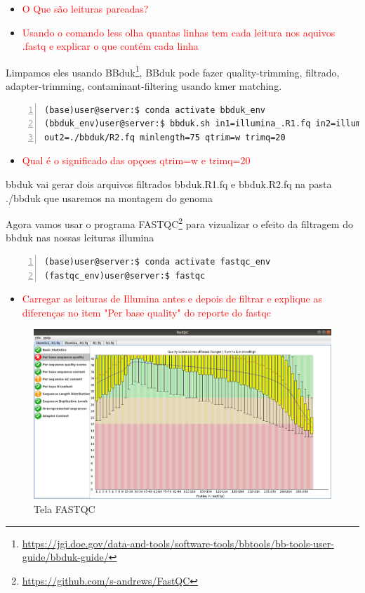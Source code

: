 \documentclass[letter,11pt]{book}
\begin{document}
\begin{itemize}
\item \textcolor{red}{O Que são leituras pareadas?}
\item \textcolor{red}{Usando o comando less olha quantas linhas tem cada leitura nos aquivos .fastq e explicar o que contém cada linha}
\end{itemize}


Limpamos eles usando BBduk\footnote{\url{https://jgi.doe.gov/data-and-tools/software-tools/bbtools/bb-tools-user-guide/bbduk-guide/}}, BBduk pode fazer quality-trimming, filtrado, adapter-trimming, contaminant-filtering usando kmer matching.

\begin{Verbatim}[commandchars=!\{\}, numbers=left,label= Limpando leituras Illumina com bbduk,frame=topline,fontsize=\scriptsize]
(base)user@server:$ conda activate bbduk_env
(bbduk_env)user@server:$ bbduk.sh in1=illumina_.R1.fq in2=illumina_.R2.fq out1=./bbduk/R1.fq \
out2=./bbduk/R2.fq minlength=75 qtrim=w trimq=20
\end{Verbatim}


\begin{itemize}
\item \textcolor{red}{Qual é o significado das opçoes qtrim=w e trimq=20}
\end{itemize}


bbduk vai gerar dois arquivos filtrados bbduk.R1.fq e bbduk.R2.fq na pasta ./bbduk que usaremos na montagem do genoma

Agora vamos usar o programa FASTQC\footnote{\url{https://github.com/s-andrews/FastQC}} para vizualizar o efeito da filtragem do bbduk nas nossas leituras illumina

\begin{Verbatim}[commandchars=!\{\}, numbers=left,label= Abrindo o FASTQC,frame=topline,fontsize=\scriptsize]
(base)user@server:$ conda activate fastqc_env 
(fastqc_env)user@server:$ fastqc
\end{Verbatim}

\begin{itemize}
\item \textcolor{red}{Carregar as leituras de Illumina antes e depois de filtrar e explique as diferenças no item "Per base quality" do reporte do fastqc}
\end{itemize}

\begin{figure}[h!]
\centering
 \includegraphics[width=12cm]{Figs/fastqc.png}
 \caption{\label{fig:fastqc}Tela FASTQC}
\end{figure}
\end{document}
